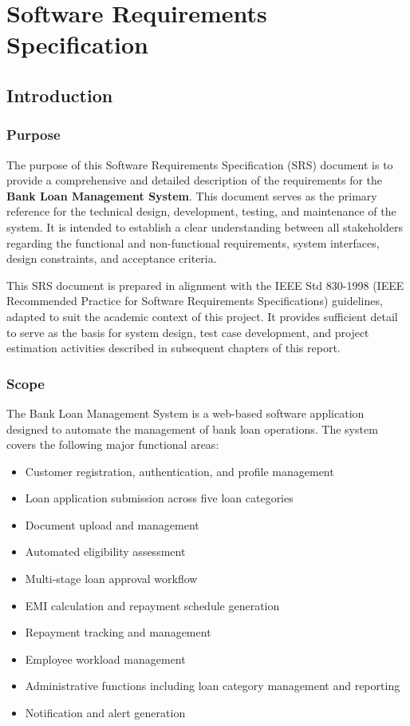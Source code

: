 \chapter{Software Requirements Specification}

\section{Introduction}

\subsection{Purpose}

The purpose of this Software Requirements Specification (SRS) document is to provide a comprehensive and detailed description of the requirements for the \textbf{Bank Loan Management System}. This document serves as the primary reference for the technical design, development, testing, and maintenance of the system. It is intended to establish a clear understanding between all stakeholders regarding the functional and non-functional requirements, system interfaces, design constraints, and acceptance criteria.

This SRS document is prepared in alignment with the IEEE Std 830-1998 (IEEE Recommended Practice for Software Requirements Specifications) guidelines, adapted to suit the academic context of this project. It provides sufficient detail to serve as the basis for system design, test case development, and project estimation activities described in subsequent chapters of this report.

\subsection{Scope}

The Bank Loan Management System is a web-based software application designed to automate the management of bank loan operations. The system covers the following major functional areas:

\begin{itemize}
  \item Customer registration, authentication, and profile management
  \item Loan application submission across five loan categories
  \item Document upload and management
  \item Automated eligibility assessment
  \item Multi-stage loan approval workflow
  \item EMI calculation and repayment schedule generation
  \item Repayment tracking and management
  \item Employee workload management
  \item Administrative functions including loan category management and reporting
  \item Notification and alert generation
\end{itemize}

